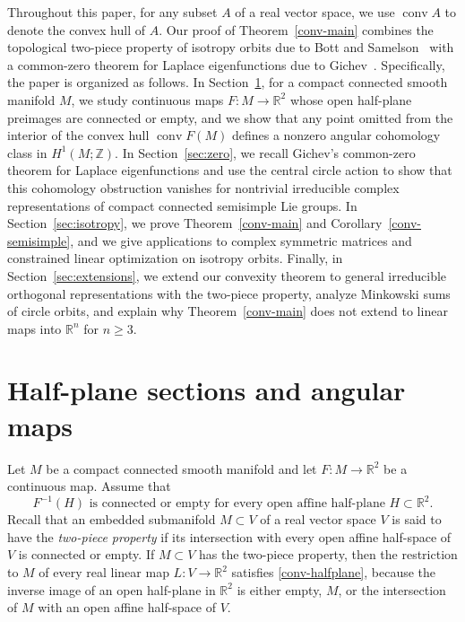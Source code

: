 \documentclass[11pt,reqno]{amsart}
\theoremstyle{remark}
\newcommand{\R}{\mathbb R}
\newcommand{\Z}{\mathbb Z}
\DeclareMathOperator{\conv}{conv}
\begin{document}
Throughout this paper, for any subset $A$ of a real vector space, we
use $\conv A$ to denote the convex hull of $A$. Our proof of
Theorem~\ref{conv-main} combines the topological two-piece property of
isotropy orbits due to Bott and Samelson~\cite{BottSamelson1958} with a
common-zero theorem for Laplace eigenfunctions due to
Gichev~\cite{Gichev2004}. Specifically, the paper is organized as
follows. In Section~\ref{sec:angular}, for a compact connected smooth
manifold $M$, we study continuous maps $F:M\to\R^2$ whose open
half-plane preimages are connected or empty, and we show that any point
omitted from the interior of the convex hull $\conv F(M)$ defines a
nonzero angular cohomology class in $H^1(M;\Z)$. In
Section~\ref{sec:zero}, we recall Gichev's common-zero theorem for
Laplace eigenfunctions and use the central circle action to show that
this cohomology obstruction vanishes for nontrivial irreducible complex
representations of compact connected semisimple Lie groups. In
Section~\ref{sec:isotropy}, we prove Theorem~\ref{conv-main} and
Corollary~\ref{conv-semisimple}, and we give applications to complex
symmetric matrices and constrained linear optimization on isotropy
orbits. Finally, in Section~\ref{sec:extensions}, we extend our
convexity theorem to general irreducible orthogonal representations with
the two-piece property, analyze Minkowski sums of circle orbits, and
explain why Theorem~\ref{conv-main} does not extend to linear maps into
$\R^n$ for $n\ge3$.

\section{Half-plane sections and angular maps}\label{sec:angular}

Let $M$ be a compact connected smooth manifold and let $F:M\to\R^2$ be a
continuous map. Assume that
\begin{equation}\label{conv-halfplane}
 F^{-1}(H)\text{ is connected or empty for every open affine
 half-plane }H\subset\R^2.
\end{equation}
Recall that an embedded submanifold $M\subset V$ of a real vector space
$V$ is said to have the \emph{two-piece property} if its intersection
with every open affine half-space of $V$ is connected or empty. If
$M\subset V$ has the two-piece property, then the restriction to $M$ of
every real linear map $L:V\to\R^2$ satisfies \eqref{conv-halfplane},
because the inverse image of an open half-plane in $\R^2$ is either
empty, $M$, or the intersection of $M$ with an open affine half-space of
$V$.
\end{document}
